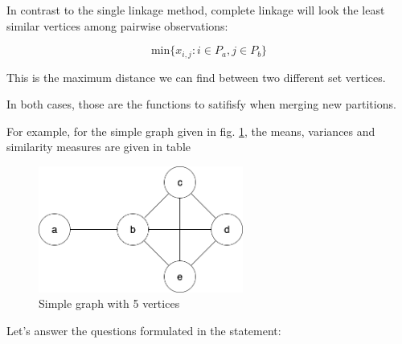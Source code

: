 \documentclass[12pt,a4paper]{article}
\begin{document}
In contrast to the single linkage method, complete linkage will look
the least similar vertices among pairwise observations:

$$ \mathrm{min}\{x_{i,j} : i \in P_a, j \in P_b\} $$

This is the maximum distance we can find between two different set
vertices.

In both cases, those are the functions to satifisfy when merging new
partitions.


For example, for the simple graph given in
fig. \ref{fig:simple_graph}, the means, variances and similarity
measures are given in table

\begin{figure}[ht!]
  \centering
  \includegraphics[width=0.6\textwidth]{img/simple_graph.png}
  \caption{Simple graph with 5 vertices}
  \label{fig:simple_graph}
\end{figure}

Let's answer the questions formulated in the statement:
\end{document}
